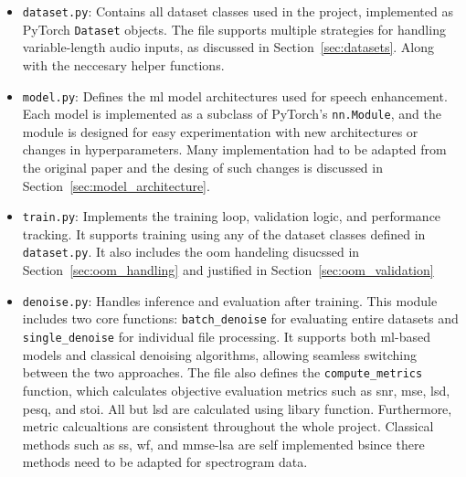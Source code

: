 \begin{itemize}
    \item \texttt{dataset.py}: Contains all dataset classes used in the project, implemented as PyTorch \texttt{Dataset} objects. The file supports multiple strategies for handling variable-length audio inputs, as discussed in Section~\ref{sec:datasets}. Along with the neccesary helper functions.

    \item \texttt{model.py}: Defines the \gls{ml} model architectures used for speech enhancement. Each model is implemented as a subclass of PyTorch’s \texttt{nn.Module}, and the module is designed for easy experimentation with new architectures or changes in hyperparameters. Many implementation had to be adapted from the original paper and the desing of such changes is discussed in Section~\ref{sec:model_architecture}.

    \item \texttt{train.py}: Implements the training loop, validation logic, and performance tracking. It supports training using any of the dataset classes defined in \texttt{dataset.py}. It also includes the \gls{oom} handeling disucssed in Section~\ref{sec:oom_handling} and justified in Section~\ref{sec:oom_validation}

    \item \texttt{denoise.py}: Handles inference and evaluation after training. This module includes two core functions: \texttt{batch\_denoise} for evaluating entire datasets and \texttt{single\_denoise} for individual file processing. It supports both \gls{ml}-based models and classical denoising algorithms, allowing seamless switching between the two approaches. The file also defines the \texttt{compute\_metrics} function, which calculates objective evaluation metrics such as \gls{snr}, \gls{mse}, \gls{lsd}, \gls{pesq}, and \gls{stoi}. All but \gls{lsd} are calculated using libary function. Furthermore, metric calcualtions are consistent throughout the whole project. Classical methods such as \gls{ss}, \gls{wf}, and \gls{mmse-lsa} are self implemented bsince there methods need to be adapted for spectrogram data.
\end{itemize}
